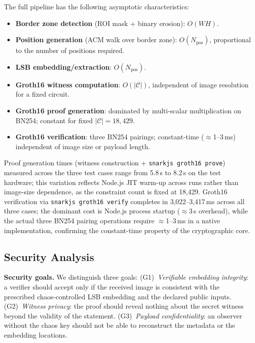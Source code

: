 \documentclass{jstarticle}
\begin{document}
The full pipeline has the following asymptotic characteristics:
\begin{itemize}
  \item \textbf{Border zone detection} (ROI mask + binary erosion): $O(WH)$.
  \item \textbf{Position generation} (ACM walk over border zone): $O(N_{\text{pos}})$,
    proportional to the number of positions required.
  \item \textbf{LSB embedding/extraction}: $O(N_{\text{pos}})$.
  \item \textbf{Groth16 witness computation}: $O(|\mathcal{C}|)$,
    independent of image resolution for a fixed circuit.
  \item \textbf{Groth16 proof generation}: dominated by multi-scalar
    multiplication on BN254; constant for fixed $|\mathcal{C}| = 18{,}429$.
  \item \textbf{Groth16 verification}: three BN254 pairings; constant-time
    ($\approx$1--3\,ms) independent of image size or payload length.
\end{itemize}

Proof generation times (witness construction + \texttt{snarkjs groth16 prove}) measured across the three test cases range from 5.8\,s to 8.2\,s on the test hardware; this variation reflects Node.js JIT warm-up across runs rather than image-size dependence, as the constraint count is fixed at 18,429.
Groth16 verification via \texttt{snarkjs groth16 verify} completes in 3{,}022--3{,}417\,ms across all three cases; the dominant cost is Node.js process startup ($\approx$3\,s overhead), while the actual three BN254 pairing operations require $\approx$1--3\,ms in a native implementation, confirming the constant-time property of the cryptographic core.

\subsection{Security Analysis}
\label{sec:security-analysis}

\textbf{Security goals.}
We distinguish three goals: (G1)~\emph{Verifiable embedding integrity}: a verifier should accept only if the received image is consistent with the prescribed chaos-controlled LSB embedding and the declared public inputs.
(G2)~\emph{Witness privacy}: the proof should reveal nothing about the secret witness beyond the validity of the statement.
(G3)~\emph{Payload confidentiality}: an observer without the chaos key should not be able to reconstruct the metadata or the embedding locations.
\end{document}
